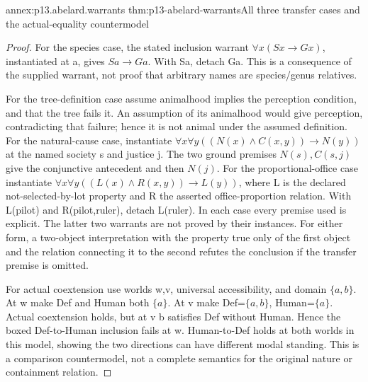 \begin{annexitem}{annex:p13.abelard.warrants}
 {thm:p13-abelard-warrants}{All three transfer cases and the actual-equality countermodel}
\begin{proof}
For the species case, the stated inclusion warrant
\(\forall x(Sx\to Gx)\), instantiated at a, gives
\(Sa\to Ga\). With Sa, detach Ga.
This is a consequence of the supplied warrant, not
proof that arbitrary names are species/genus relatives.

For the tree-definition case assume animalhood implies
the perception condition, and that the tree fails it.
An assumption of its animalhood would give perception,
contradicting that failure; hence it is not animal
under the assumed definition.
For the natural-cause case, instantiate
\(\forall x\forall y((N(x)\land C(x,y))\to N(y))\)
at the named society s and justice j.
The two ground premises \(N(s),C(s,j)\) give the
conjunctive antecedent and then \(N(j)\).
For the proportional-office case instantiate
\(\forall x\forall y((L(x)\land R(x,y))\to L(y))\),
where L is the declared not-selected-by-lot property
and R the asserted office-proportion relation.
With L(pilot) and R(pilot,ruler), detach L(ruler).
In each case every premise used is explicit.
The latter two warrants are not proved by their instances.
For either form, a two-object interpretation with
the property true only of the first object and the
relation connecting it to the second refutes the
conclusion if the transfer premise is omitted.

For actual coextension use worlds w,v, universal
accessibility, and domain \(\{a,b\}\).
At w make Def and Human both \(\{a\}\).
At v make Def=\(\{a,b\}\), Human=\(\{a\}\).
Actual coextension holds, but at v b satisfies Def
without Human. Hence the boxed Def-to-Human
inclusion fails at w.
Human-to-Def holds at both worlds in this model,
showing the two directions can have different
modal standing. This is a comparison countermodel,
not a complete semantics for the original nature
or containment relation.
\end{proof}
\end{annexitem}

